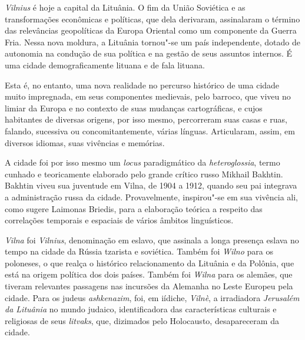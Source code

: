\hfill{}
\bigskip
\bigskip
\bigskip

\begin{multicols}{2}


\noindent{}\textit{\textit{Vilnius}} é hoje a capital da Lituânia. O fim da União Soviética e as transformações econômicas e políticas, que dela derivaram, assinalaram o término das relevâncias geopolíticas da Europa Oriental como um componente da Guerra Fria. Nessa nova moldura, a Lituânia tornou"-se um país independente, dotado de autonomia na condução de sua política e na gestão de seus assuntos internos. É uma cidade demograficamente lituana e de fala lituana.

Esta é, no entanto, uma nova realidade no percurso histórico de uma
cidade muito impregnada, em seus componentes medievais, pelo barroco,
que viveu no limiar da Europa e no contexto de suas mudanças
cartográficas, e cujos habitantes de diversas origens, por isso mesmo,
percorreram suas casas e ruas, falando, sucessiva ou concomitantemente,
várias línguas. Articularam, assim, em diversos idiomas, suas vivências
e memórias.

A cidade foi por isso mesmo um \textit{locus} paradigmático da
\textit{heteroglossia}, termo cunhado e teoricamente elaborado pelo grande
crítico russo Mikhail Bakhtin. Bakhtin viveu sua juventude em Vilna, de
1904 a 1912, quando seu pai integrava a administração russa da cidade.
Provavelmente, inspirou"-se em sua vivência ali, como sugere Laimonas
Briedis, para a elaboração teórica a respeito das correlações temporais
e espaciais de vários âmbitos linguísticos.

\textit{\textit{Vilna}} foi \textit{Vilnius}, denominação em eslavo, que assinala a longa
presença eslava no tempo na cidade da Rússia tzarista e soviética.
Também foi \textit{Wilno} para os poloneses, o que realça o histórico
relacionamento da Lituânia e da Polônia, que está na origem política dos
dois países. Também foi \textit{Wilna} para os alemães, que tiveram relevantes
passagens nas incursões da Alemanha no Leste Europeu pela cidade. Para
os judeus \textit{ashkenazim}, foi, em iídiche, \textit{Vilnè}, a irradiadora
\textit{Jerusalém da Lituânia} no mundo judaico, identificadora das
características culturais e religiosas de seus \textit{litvaks}, que,
dizimados pelo Holocausto, desapareceram da cidade.


\end{multicols}
